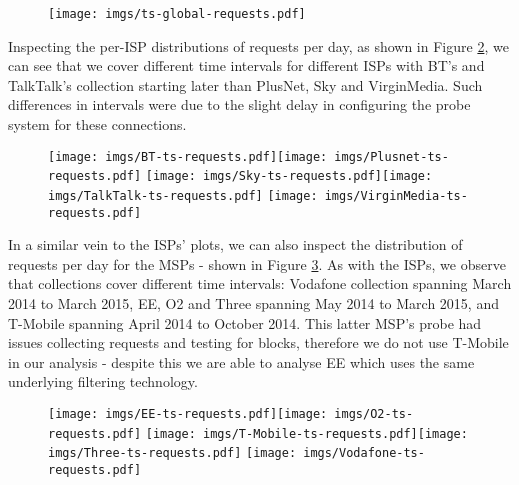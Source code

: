 \documentclass{bmcart}
\begin{document}
\begin{figure}[t]
\caption{}
\texttt{[image: imgs/ts-global-requests.pdf]}
\label{fig:total-requests}
\end{figure}

Inspecting the per-ISP distributions of requests per day, as shown in Figure \ref{fig:broadband-requests}, we can see that we cover different time intervals for different ISPs with BT's and TalkTalk's collection starting later than PlusNet, Sky and VirginMedia.
Such differences in intervals were due to the slight delay in configuring the probe system for these connections. 

\begin{figure}[h!]
\caption{}
\texttt{[image: imgs/BT-ts-requests.pdf]}\texttt{[image: imgs/Plusnet-ts-requests.pdf]}
\texttt{[image: imgs/Sky-ts-requests.pdf]}\texttt{[image: imgs/TalkTalk-ts-requests.pdf]}
\texttt{[image: imgs/VirginMedia-ts-requests.pdf]}
\label{fig:broadband-requests}
\end{figure}

In a similar vein to the ISPs' plots, we can also inspect the distribution of requests per day for the MSPs - shown in Figure \ref{fig:mobile-requests}.
As with the ISPs, we observe that collections cover different time intervals: Vodafone collection spanning March 2014 to March 2015, EE, O2 and Three spanning May 2014 to March 2015, and T-Mobile spanning April 2014 to October 2014.
This latter MSP's probe had issues collecting requests and testing for blocks, therefore we do not use T-Mobile in our analysis - despite this we are able to analyse EE which uses the same underlying filtering technology.

\begin{figure}[h!]
\caption{}
\texttt{[image: imgs/EE-ts-requests.pdf]}\texttt{[image: imgs/O2-ts-requests.pdf]}
\texttt{[image: imgs/T-Mobile-ts-requests.pdf]}\texttt{[image: imgs/Three-ts-requests.pdf]}
\texttt{[image: imgs/Vodafone-ts-requests.pdf]}
\label{fig:mobile-requests}
\end{figure}
\end{document}
